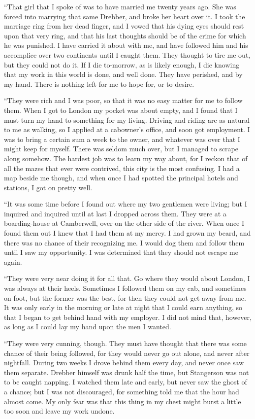 \documentclass[12pt,english,oneside]{book}
\begin{document}
{}``That girl that I spoke of was to have married me twenty years
ago. She was forced into marrying that same Drebber, and broke her
heart over it. I took the marriage ring from her dead finger, and
I vowed that his dying eyes should rest upon that very ring, and that
his last thoughts should be of the crime for which he was punished.
I have carried it about with me, and have followed him and his accomplice
over two continents until I caught them. They thought to tire me out,
but they could not do it. If I die to-morrow, as is likely enough,
I die knowing that my work in this world is done, and well done. They
have perished, and by my hand. There is nothing left for me to hope
for, or to desire.

{}``They were rich and I was poor, so that it was no easy matter
for me to follow them. When I got to London my pocket was about empty,
and I found that I must turn my hand to something for my living. Driving
and riding are as natural to me as walking, so I applied at a cabowner's
office, and soon got employment. I was to bring a certain sum a week
to the owner, and whatever was over that I might keep for myself.
There was seldom much over, but I managed to scrape along somehow.
The hardest job was to learn my way about, for I reckon that of all
the mazes that ever were contrived, this city is the most confusing.
I had a map beside me though, and when once I had spotted the principal
hotels and stations, I got on pretty well.

{}``It was some time before I found out where my two gentlemen were
living; but I inquired and inquired until at last I dropped across
them. They were at a boarding-house at Camberwell, over on the other
side of the river. When once I found them out I knew that I had them
at my mercy. I had grown my beard, and there was no chance of their
recognizing me. I would dog them and follow them until I saw my opportunity.
I was determined that they should not escape me again.

{}``They were very near doing it for all that. Go where they would
about London, I was always at their heels. Sometimes I followed them
on my cab, and sometimes on foot, but the former was the best, for
then they could not get away from me. It was only early in the morning
or late at night that I could earn anything, so that I began to get
behind hand with my employer. I did not mind that, however, as long
as I could lay my hand upon the men I wanted.

{}``They were very cunning, though. They must have thought that there
was some chance of their being followed, for they would never go out
alone, and never after nightfall. During two weeks I drove behind
them every day, and never once saw them separate. Drebber himself
was drunk half the time, but Stangerson was not to be caught napping.
I watched them late and early, but never saw the ghost of a chance;
but I was not discouraged, for something told me that the hour had
almost come. My only fear was that this thing in my chest might burst
a little too soon and leave my work undone.
\end{document}
